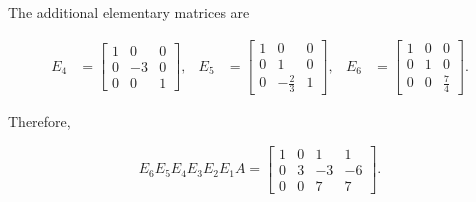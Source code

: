 \begin{enumerate}[label=\roman*)]
\begin{answer}
        The additional elementary matrices are

        $$
        \begin{aligned}
        E_4 &=
        \begin{bmatrix}
            1 & 0 & 0 \\
            0 & -3 & 0 \\
            0 & 0 & 1
        \end{bmatrix},
        &
        E_5 &=
        \begin{bmatrix}
            1 & 0 & 0 \\
            0 & 1 & 0 \\
            0 & -\frac{2}{3} & 1
        \end{bmatrix},
        &
        E_6 &=
        \begin{bmatrix}
            1 & 0 & 0 \\
            0 & 1 & 0 \\
            0 & 0 & \frac{7}{4}
        \end{bmatrix}.
        \end{aligned}
        $$

        Therefore,

        $$
        \boxed{
        E_6E_5E_4E_3E_2E_1A=
        \begin{bmatrix}
            1 & 0 & 1 & 1 \\
            0 & 3 & -3 & -6 \\
            0 & 0 & 7 & 7
        \end{bmatrix}
        }.
        $$
    \end{answer}

\end{enumerate}